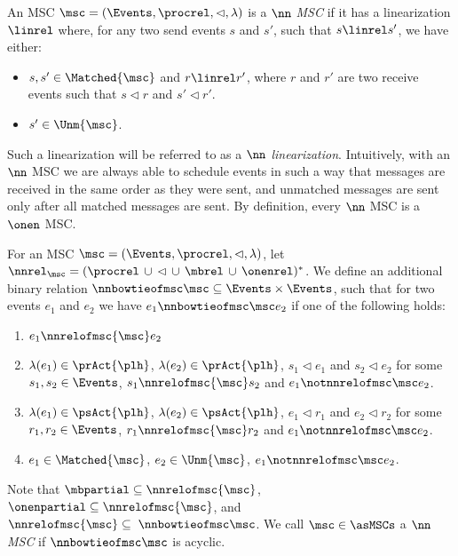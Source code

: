 \begin{definition}[$\nn$ MSC]%
	An MSC $\msc = (\Events,\procrel,\lhd,\lambda)$ is a \emph{$\nn$ MSC} if it has a linearization $\linrel$ where, for any two send events $s$ and $s'$, such that $s \linrel s'$, we have either:
	\begin{itemize}\itemsep=0.5ex
		\item $s,s' \in \Matched{\msc}$ and $r \linrel r'$, where $r$ and $r'$ are two receive events such that $s \lhd r$ and $s' \lhd r'$.
		\item $s' \in \Unm{\msc}$.
	\end{itemize}
\end{definition}

Such a linearization will be referred to as a \emph{$\nn$ linearization}. Intuitively, with an $\nn$ MSC we are always able to schedule events in such a way that messages are received in the same order as they were sent, and unmatched messages are sent only after all matched messages are sent. By definition, every $\nn$ MSC is a $\onen$ MSC.

\begin{definition} [$\nn$ alternative]%
For an MSC $\msc = (\Events,\procrel,\lhd,\lambda)$, let ${\nnrel}_\msc = ({\procrel} \,\cup\, {\lhd} \,\cup\, {\mbrel} \,\cup\, {\onenrel})^\ast$. We define an additional binary relation $\nnbowtieofmsc\msc \subseteq \Events \times \Events$, such that for two events $e_1$ and $e_2$ we have $e_1 \nnbowtieofmsc\msc e_2$ if one of the following holds:
\begin{enumerate}\itemsep=0.5ex
	\item $e_1 \nnrelofmsc{\msc} e_2$
	\item $\lambda(e_1) \in \prAct{\plh}$, $\lambda(e_2) \in \prAct{\plh}$, $s_1 \lhd e_1$ and $s_2 \lhd e_2$ for some $s_1,s_2 \in \Events$, $s_1 \nnrelofmsc{\msc} s_2$ and $e_1 \notnnrelofmsc\msc e_2$.
	\item $\lambda(e_1) \in \psAct{\plh}$, $\lambda(e_2) \in \psAct{\plh}$, $e_1 \lhd r_1$ and $e_2 \lhd r_2$ for some $r_1,r_2 \in \Events$, $r_1 \nnrelofmsc{\msc} r_2$ and $e_1 \notnnrelofmsc\msc e_2$.
	\item $e_1 \in \Matched{\msc}$, $e_2 \in \Unm{\msc}$, $e_1 \notnnrelofmsc\msc e_2$.
\end{enumerate}

Note that $\mbpartial \subseteq \nnrelofmsc{\msc}$, $\onenpartial \subseteq \nnrelofmsc{\msc}$, and $\nnrelofmsc{\msc} \subseteq\; \nnbowtieofmsc\msc$. We call $\msc \in \asMSCs$ a \emph{$\nn$ MSC}
if ${\nnbowtieofmsc\msc}$ is acyclic.
\end{definition}


